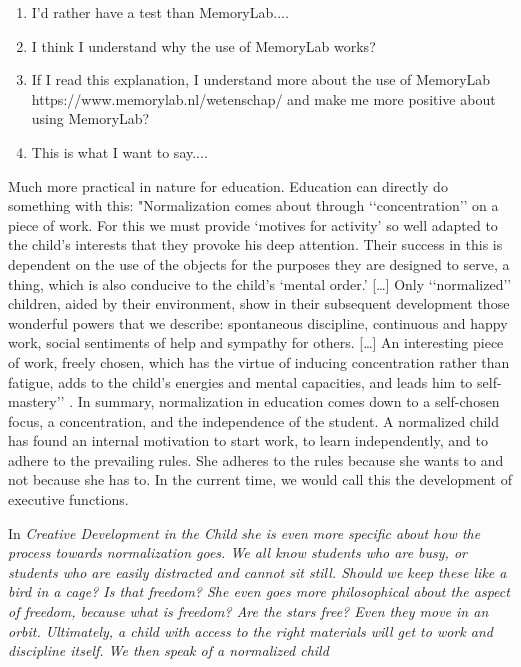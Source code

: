 \documentclass[12pt, a4paper]{article}
\begin{document}
\begin{enumerate}
\item I'd rather have a test than MemoryLab....
\item I think I understand why the use of MemoryLab works?
\item If I read this explanation, I understand more about the use of MemoryLab\\
     https://www.memorylab.nl/wetenschap/ and make me more positive about using MemoryLab?
\item This is what I want to say....
\end{enumerate}

Much more practical in nature for education. Education can directly do something with this: "Normalization comes about through ‘‘concentration’’ on a piece of work. For this we must provide ‘motives for activity’ so well adapted to the child’s interests that they provoke his deep attention. Their success in this is dependent on the use of the objects for the purposes they are designed to serve, a thing, which is also conducive to the child’s ‘mental order.’ […] Only ‘‘normalized’’ children, aided by their environment, show in their subsequent development those wonderful powers that we describe: spontaneous discipline, continuous and happy work, social sentiments of help and sympathy for others. […] An interesting piece of work, freely chosen, which has the virtue of inducing concentration rather than fatigue, adds to the child’s energies and mental capacities, and leads him to self-mastery’’ \cite[pp. 185-186]{Montessori2016}. In summary, normalization in education comes down to a self-chosen focus, a concentration, and the independence of the student. A normalized child has found an internal motivation to start work, to learn independently, and to adhere to the prevailing rules. She adheres to the rules because she wants to and not because she has to. In the current time, we would call this the development of executive functions.

In \em Creative Development in the Child \em she is even more specific about how the process towards normalization goes. We all know students who are busy, or students who are easily distracted and cannot sit still. Should we keep these like a bird in a cage? Is that freedom? She even goes more philosophical about the aspect of freedom, because what is freedom? Are the stars free? Even they move in an orbit. Ultimately, a child with access to the right materials will get to work and discipline itself. We then speak of a normalized child \cite[pp. 125-132]{Montessori2020}
\end{document}
